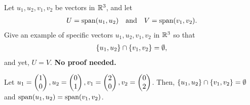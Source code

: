 \begin{question}
    \normalfont
    Let $u_1, u_2, v_1, v_2$ be vectors in ${\mathbb R}^3$, and let
    \begin{align*}
        U=\textnormal{span}(u_1,u_2)\ \ \ \textup{and} \ \ \
        V=\textnormal{span}(v_1,v_2).
    \end{align*}
    Give an example of specific vectors $u_1, u_2, v_1, v_2$ in ${\mathbb R}^3$ so that
    \begin{align*}
        \{u_1, u_2\}\cap \{ v_1, v_2 \} = \emptyset,
    \end{align*}
    and yet, $U=V$.  \textbf{No proof needed.}
\end{question}

\begin{sol}
    Let $u_1=\begin{pmatrix} 1\\ 0\end{pmatrix},u_2=\begin{pmatrix} 0\\ 1\end{pmatrix},v_1=\begin{pmatrix} 2\\ 0\end{pmatrix},v_2=\begin{pmatrix} 0\\ 2\end{pmatrix}$. Then, $\{u_1,u_2\}\cap\{v_1,v_2\}=\emptyset$ and $\textnormal{span}(u_1,u_2)=\textnormal{span}(v_1,v_2)$.\\
\end{sol}